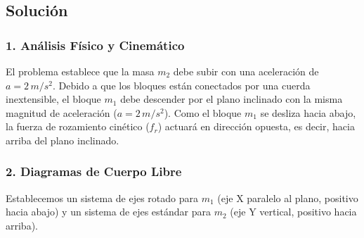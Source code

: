 \documentclass[12pt, a4paper]{article}
\begin{document}
\begin{center}
\end{center}

\subsection*{Solución}

\subsubsection*{1. Análisis Físico y Cinemático}
El problema establece que la masa $m_2$ debe subir con una aceleración de $a = 2\,\si{m/s^2}$.
Debido a que los bloques están conectados por una cuerda inextensible, el bloque $m_1$ debe descender por el plano inclinado con la misma magnitud de aceleración ($a = 2\,\si{m/s^2}$).
Como el bloque $m_1$ se desliza hacia abajo, la fuerza de rozamiento cinético ($f_r$) actuará en dirección opuesta, es decir, hacia arriba del plano inclinado.

\subsubsection*{2. Diagramas de Cuerpo Libre}
Establecemos un sistema de ejes rotado para $m_1$ (eje X paralelo al plano, positivo hacia abajo) y un sistema de ejes estándar para $m_2$ (eje Y vertical, positivo hacia arriba).
\end{document}
